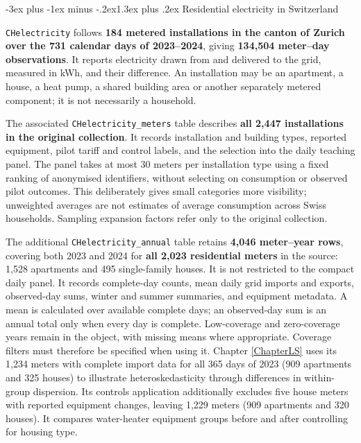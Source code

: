 \documentclass[
  11pt,
]{book}
\makeatletter
\renewcommand\section{\@startsection{section}{1}{\z@}
  {-3ex plus -1ex minus -.2ex}{1.3ex plus .2ex}
  {\normalfont\Large\bfseries\color{TextbookInk}}}
\theoremstyle{definition}
\theoremstyle{definition}
\theoremstyle{definition}
\theoremstyle{definition}
\theoremstyle{remark}
\makeatother
\begin{document}
\section{Residential electricity in Switzerland}\label{data-electricity}

\texttt{CHelectricity} follows \textbf{184 metered installations in the canton of Zurich over the 731 calendar days of 2023--2024}, giving \textbf{134,504 meter--day observations}. It reports electricity drawn from and delivered to the grid, measured in kWh, and their difference. An installation may be an apartment, a house, a heat pump, a shared building area or another separately metered component; it is not necessarily a household.

The associated \texttt{CHelectricity\_meters} table describes \textbf{all 2,447 installations in the original collection}. It records installation and building types, reported equipment, pilot tariff and control labels, and the selection into the daily teaching panel. The panel takes at most 30 meters per installation type using a fixed ranking of anonymised identifiers, without selecting on consumption or observed pilot outcomes. This deliberately gives small categories more visibility; unweighted averages are not estimates of average consumption across Swiss households. Sampling expansion factors refer only to the original collection.

The additional \texttt{CHelectricity\_annual} table retains \textbf{4,046 meter--year rows}, covering both 2023 and 2024 for \textbf{all 2,023 residential meters} in the source: 1,528 apartments and 495 single-family houses. It is not restricted to the compact daily panel. It records complete-day counts, mean daily grid imports and exports, observed-day sums, winter and summer summaries, and equipment metadata. A mean is calculated over available complete days; an observed-day sum is an annual total only when every day is complete. Low-coverage and zero-coverage years remain in the object, with missing means where appropriate. Coverage filters must therefore be specified when using it. Chapter \ref{ChapterLS} uses its 1,234 meters with complete import data for all 365 days of 2023 (909 apartments and 325 houses) to illustrate heteroskedasticity through differences in within-group dispersion. Its controls application additionally excludes five house meters with reported equipment changes, leaving 1,229 meters (909 apartments and 320 houses). It compares water-heater equipment groups before and after controlling for housing type.
\end{document}
